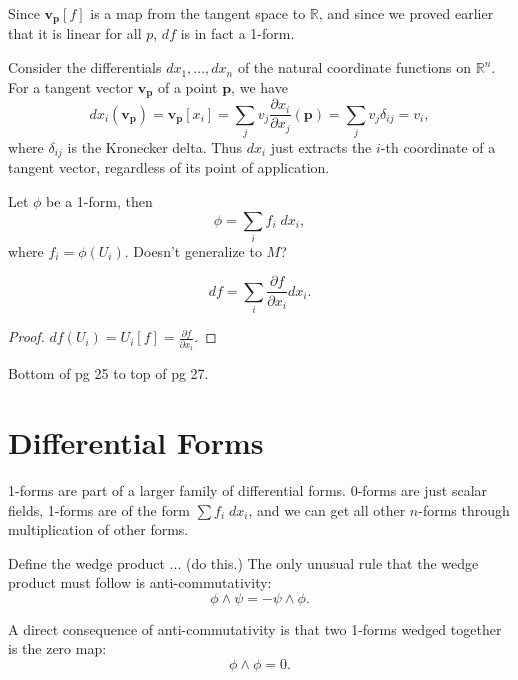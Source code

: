 \documentclass[10pt]{report}
\begin{document}
Since $\mathbf{v}_{\mathbf{p}}[f]$ is a map from the tangent space to $\mathbb{R}$, and since we proved earlier that it is linear for all $p$, $df$ is in fact a 1-form.

\begin{ex}
Consider the differentials $dx_1, \dots, dx_n$ of the natural coordinate functions on $\mathbb{R}^n$. For a tangent vector $\mathbf{v}_{\mathbf{p}}$ of a point $\mathbf{p}$, we have
\[
	dx_i(\mathbf{v}_{\mathbf{p}}) = \mathbf{v}_{\mathbf{p}}[x_i] = \sum_j v_j \frac{\partial x_i}{\partial x_j} (\mathbf{p}) = \sum_j v_j \delta_{ij} = v_i,
\] where $\delta_{ij}$ is the Kronecker delta. Thus $dx_i$ just extracts the $i$-th coordinate of a tangent vector, regardless of its point of application.
\end{ex}

\begin{prop}
Let $\phi$ be a 1-form, then
\[
	\phi = \sum_i f_i \;dx_i,
\] where $f_i = \phi(U_i)$. {\color{red}Doesn't generalize to $M$?}
\end{prop}

\begin{cor}
	\[ df = \sum_i \frac{\partial f}{\partial x_i} dx_i.\]
\end{cor}
\begin{proof}
	$df(U_i) = U_i[f] = \frac{\partial f}{\partial x_i} .$
\end{proof}

{\color{red}Bottom of pg 25 to top of pg 27.}




\section{Differential Forms}

1-forms are part of a larger family of differential forms. 0-forms are just scalar fields, 1-forms are of the form $\sum f_i \;dx_i$, and we can get all other $n$-forms through multiplication of other forms.

Define the wedge product ... {\color{red}(do this.)} The only unusual rule that the wedge product must follow is anti-commutativity:
\[
\phi \wedge \psi = - \psi \wedge \phi.
\] 

\begin{ex}
A direct consequence of anti-commutativity is that two 1-forms wedged together is the zero map:
\[
\phi\wedge\phi = 0.
\] 
\end{ex}
\end{document}
